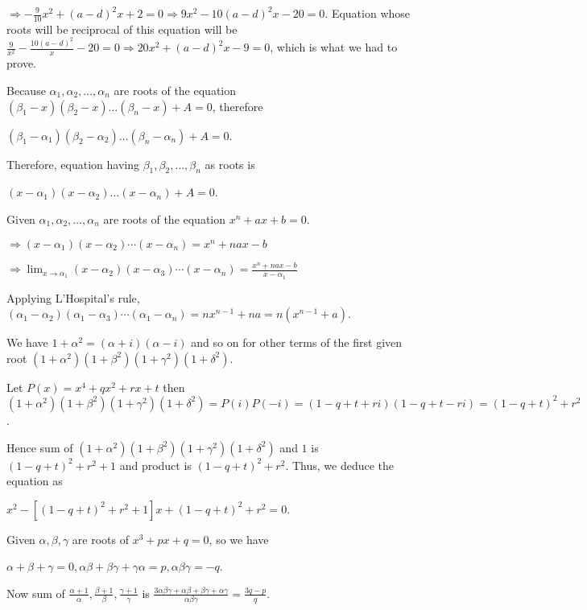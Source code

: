   $\Rightarrow -\frac{9}{10}x^2 + (a - d)^2x + 2 = 0 \Rightarrow 9x^2 - 10(a - d)^2x - 20 = 0$. Equation
  whose roots will be reciprocal of this equation will be $\frac{9}{x^2} - \frac{10(a - d)^2}{x} - 20 =
  0\Rightarrow 20x^2 + (a - d)^2x - 9 = 0$, which is what we had to prove.
\item Because $\alpha_1, \alpha_2, \ldots, \alpha_n$ are roots of the equation $(\beta_1 - x)(\beta_2 -
  x)\ldots (\beta_n - x) + A = 0$, therefore

  $(\beta_1 - \alpha_1)(\beta_2 - \alpha_2)\ldots (\beta_n - \alpha_n) + A = 0$.

  Therefore, equation having $\beta_1, \beta_2, \ldots, \beta_n$ as roots is

  $(x - \alpha_1)(x - \alpha_2)\ldots(x - \alpha_n) + A = 0$.
\item Given $\alpha_1, \alpha_2, \ldots, \alpha_n$ are roots of the equation $x^n + ax + b = 0$.

  $\Rightarrow (x - \alpha_1)(x - \alpha_2)\cdots(x - \alpha_n) = x^n + nax - b$

  $\displaystyle\Rightarrow \lim_{x\to\alpha_1}(x - \alpha_2)(x - \alpha_3)\cdots(x - \alpha_n) = \frac{x^n
  + nax - b}{x - \alpha_1}$

  Applying L'Hospital's rule, $(\alpha_1 - \alpha_2)(\alpha_1 - \alpha_3)\cdots(\alpha_1 - \alpha_n) = nx^{n
    - 1} + na = n(x^{n - 1} + a)$.
\item We have $1 + \alpha^2 = (\alpha + i)(\alpha - i)$ and so on for other terms of the first given root
  $(1 + \alpha^2)(1 + \beta^2)(1 + \gamma^2)(1 + \delta^2)$.

  Let $P(x) = x^4 + qx^2 + rx + t$ then $(1 + \alpha^2)(1 + \beta^2)(1 + \gamma^2)(1 + \delta^2) = P(i)P(-i)
  = (1 - q + t + ri)(1 - q + t - ri) = (1 - q + t)^2 + r^2$.

  Hence sum of $(1 + \alpha^2)(1 + \beta^2)(1 + \gamma^2)(1 + \delta^2)$ and $1$ is $(1 - q + t)^2 + r^2 +
  1$ and product is $(1 - q + t)^2 + r^2$. Thus, we deduce the equation as

  $x^2 - [(1 - q + t)^2 + r^2 + 1]x + (1 - q + t)^2 + r^2 = 0$.
\item Given $\alpha, \beta, \gamma$ are roots of $x^3 + px + q = 0$, so we have

  $\alpha + \beta + \gamma = 0, \alpha\beta + \beta\gamma + \gamma\alpha = p, \alpha\beta\gamma = -q$.

  Now sum of $\frac{\alpha + 1}{\alpha}, \frac{\beta + 1}{\beta}, \frac{\gamma + 1}{\gamma}$ is
  $\frac{3\alpha\beta\gamma + \alpha\beta + \beta\gamma + \alpha\gamma}{\alpha\beta\gamma} = \frac{3q -
    p}{q}$.

